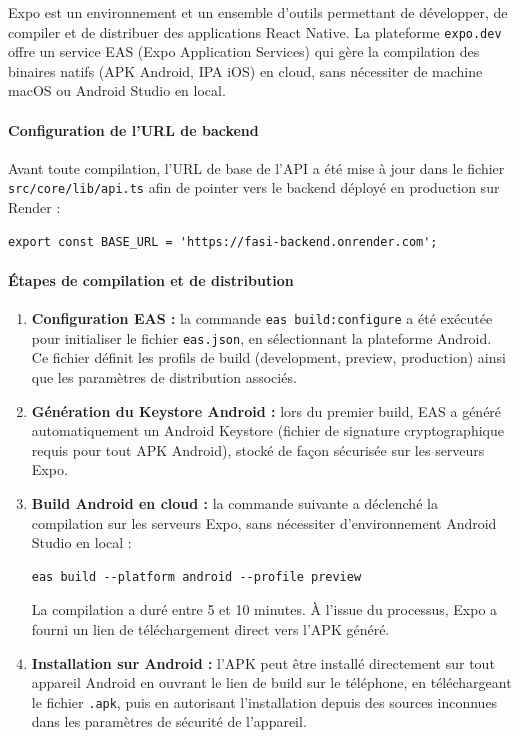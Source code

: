 \documentclass[a4paper,12pt]{report}
\begin{document}
Expo est un environnement et un ensemble d'outils permettant de développer, de compiler et de distribuer des applications React Native. La plateforme \texttt{expo.dev} offre un service EAS (Expo Application Services) qui gère la compilation des binaires natifs (APK Android, IPA iOS) en cloud, sans nécessiter de machine macOS ou Android Studio en local.

\paragraph{Configuration de l'URL de backend}

Avant toute compilation, l'URL de base de l'API a été mise à jour dans le fichier \texttt{src/core/lib/api.ts} afin de pointer vers le backend déployé en production sur Render :

\begin{verbatim}
export const BASE_URL = 'https://fasi-backend.onrender.com';
\end{verbatim}

\paragraph{Étapes de compilation et de distribution}

\begin{enumerate}
    \item \textbf{Configuration EAS :} la commande \texttt{eas build:configure} a été exécutée pour initialiser le fichier \texttt{eas.json}, en sélectionnant la plateforme Android. Ce fichier définit les profils de build (development, preview, production) ainsi que les paramètres de distribution associés.

    \item \textbf{Génération du Keystore Android :} lors du premier build, EAS a généré automatiquement un Android Keystore (fichier de signature cryptographique requis pour tout APK Android), stocké de façon sécurisée sur les serveurs Expo.

    \item \textbf{Build Android en cloud :} la commande suivante a déclenché la compilation sur les serveurs Expo, sans nécessiter d'environnement Android Studio en local :
    \begin{verbatim}
eas build --platform android --profile preview
    \end{verbatim}
    La compilation a duré entre 5 et 10 minutes. À l'issue du processus, Expo a fourni un lien de téléchargement direct vers l'APK généré.

    \item \textbf{Installation sur Android :} l'APK peut être installé directement sur tout appareil Android en ouvrant le lien de build sur le téléphone, en téléchargeant le fichier \texttt{.apk}, puis en autorisant l'installation depuis des sources inconnues dans les paramètres de sécurité de l'appareil.
\end{enumerate}
\end{document}
